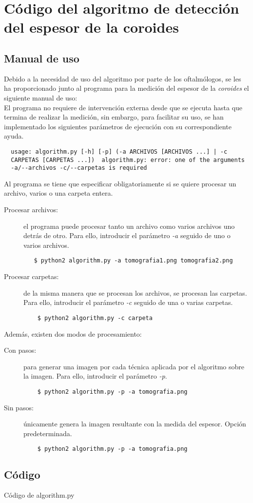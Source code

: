 \chapter{Código del algoritmo de detección del espesor de la coroides}
\section{Manual de uso}
Debido a la necesidad de uso del algoritmo por parte de los
oftalmólogos, se les ha proporcionado junto al programa para la
medición del espesor de la \emph{\gls{coroides}} el siguiente manual de uso:\\
El programa no requiere de intervención externa desde que se ejecuta
hasta que termina de realizar la medición, sin embargo, para facilitar
su uso, se han implementado los siguientes parámetros de ejecución con
su correspondiente ayuda.
\begin{verbatim}
  usage: algorithm.py [-h] [-p] (-a ARCHIVOS [ARCHIVOS ...] | -c
  CARPETAS [CARPETAS ...])  algorithm.py: error: one of the arguments
  -a/--archivos -c/--carpetas is required
\end{verbatim}

Al programa se tiene que especificar obligatoriamente si se
quiere procesar un archivo, varios o una carpeta entera.
\begin{description}
\item[Procesar archivos:] el programa puede procesar tanto un archivo
  como varios archivos uno detrás de otro. Para ello, introducir el
  parámetro \emph{-a} seguido de uno o varios archivos.
 \begin{verbatim}
   $ python2 algorithm.py -a tomografia1.png tomografia2.png
  \end{verbatim}
\item[Procesar carpetas:] de la misma manera que se procesan los
  archivos, se procesan las carpetas. Para ello, introducir el
  parámetro \emph{-c} seguido de una o varias carpetas.
 \begin{verbatim}
    $ python2 algorithm.py -c carpeta
  \end{verbatim}
\end{description}

Además, existen dos modos de procesamiento:
\begin{description}
\item[Con pasos:] para generar una imagen por cada técnica aplicada
  por el algoritmo sobre la imagen. Para ello, introducir el parámetro
  \emph{-p}.
  \begin{verbatim}
    $ python2 algorithm.py -p -a tomografia.png
  \end{verbatim}
\item[Sin pasos:] únicamente genera la imagen resultante con la medida
  del espesor. Opción predeterminada.
  \begin{verbatim}
    $ python2 algorithm.py -p -a tomografia.png
  \end{verbatim}
\end{description}

\section{Código}

\begin{codigo_python}
  \caption{Código de algorithm.py}
  \inputminted[fontsize=\scriptsize, linenos, breaklines]{python}{../OpenCV/algorithm.py}
\end{codigo_python}
